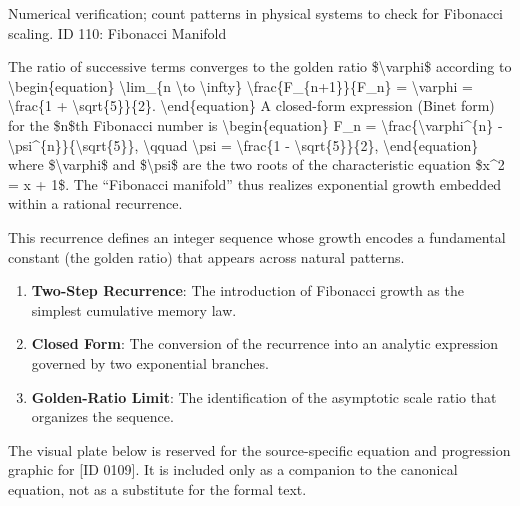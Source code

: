 Numerical verification; count patterns in physical systems to check for Fibonacci scaling. ID 110: Fibonacci Manifold

The ratio of successive terms converges to the golden ratio \$\textbackslash{}varphi\$ according to \textbackslash{}begin\{equation\} \textbackslash{}lim\_\{n \textbackslash{}to \textbackslash{}infty\} \textbackslash{}frac\{F\_\{n+1\}\}\{F\_n\} = \textbackslash{}varphi = \textbackslash{}frac\{1 + \textbackslash{}sqrt\{5\}\}\{2\}. \textbackslash{}end\{equation\} A closed-form expression (Binet form) for the \$n\$th Fibonacci number is \textbackslash{}begin\{equation\} F\_n = \textbackslash{}frac\{\textbackslash{}varphi\textasciicircum{}\{n\} - \textbackslash{}psi\textasciicircum{}\{n\}\}\{\textbackslash{}sqrt\{5\}\}, \textbackslash{}qquad \textbackslash{}psi = \textbackslash{}frac\{1 - \textbackslash{}sqrt\{5\}\}\{2\}, \textbackslash{}end\{equation\} where \$\textbackslash{}varphi\$ and \$\textbackslash{}psi\$ are the two roots of the characteristic equation \$x\textasciicircum{}2 = x + 1\$. The ``Fibonacci manifold'' thus realizes exponential growth embedded within a rational recurrence.

This recurrence defines an integer sequence whose growth encodes a fundamental constant (the golden ratio) that appears across natural patterns.
\endgroup

\begin{enumerate}[leftmargin=1.6em,itemsep=6pt,topsep=4pt]
\item \textbf{Two-Step Recurrence}: The introduction of Fibonacci growth as the simplest cumulative memory law.
\item \textbf{Closed Form}: The conversion of the recurrence into an analytic expression governed by two exponential branches.
\item \textbf{Golden-Ratio Limit}: The identification of the asymptotic scale ratio that organizes the sequence.
\end{enumerate}

\begingroup\footnotesize\sloppy
The visual plate below is reserved for the source-specific equation and progression graphic for [ID 0109]. It is included only as a companion to the canonical equation, not as a substitute for the formal text.
\par\endgroup
\ifTZPDarkEdition
{}
\fi

